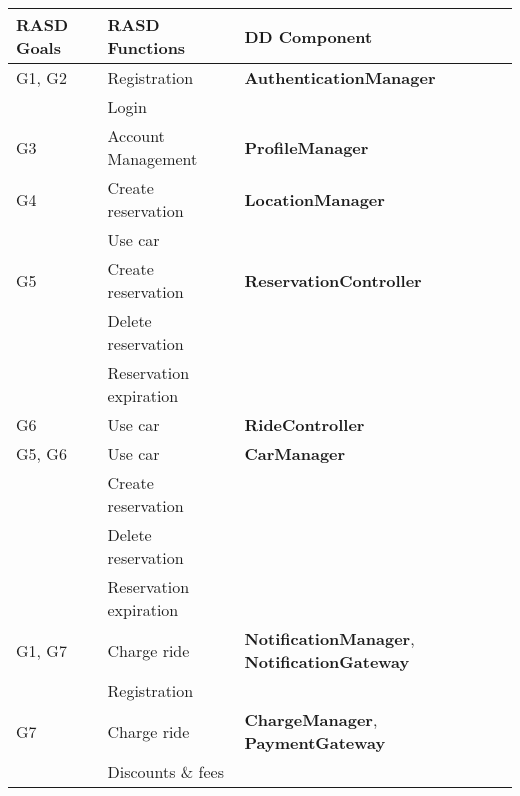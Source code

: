 \begin{center}
	\vspace{0.6cm}
	\begin{tabular}{|l|l|l|}
		\hline
		RASD Goals & RASD Functions & DD Component \\\hline
		\hline
		G1, G2 & Registration & \textbf{AuthenticationManager} \\
		       & Login & \\\hline
		G3 & Account Management & \textbf{ProfileManager} \\\hline
		G4 & Create reservation & \textbf{LocationManager} \\\hline
		   & Use car & \\\hline
		G5 & Create reservation & \textbf{ReservationController} \\
		   & Delete reservation & \\
		   & Reservation expiration & \\\hline
		G6 & Use car & \textbf{RideController} \\\hline
		G5, G6 & Use car & \textbf{CarManager} \\\hline
		       & Create reservation & \\
			   & Delete reservation & \\
			   & Reservation expiration & \\\hline	
		G1, G7 & Charge ride & \textbf{NotificationManager}, \textbf{NotificationGateway} \\
		       & Registration & \\\hline
		G7 & Charge ride & \textbf{ChargeManager}, \textbf{PaymentGateway} \\
		       & Discounts \& fees & \\\hline
	\end{tabular}
\end{center}